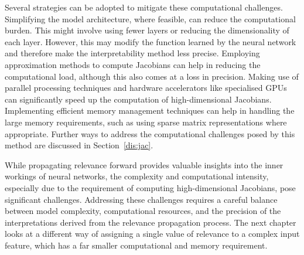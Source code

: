 Several strategies can be adopted to mitigate these computational challenges. Simplifying the model architecture, where feasible, can reduce the computational burden. This might involve using fewer layers or reducing the dimensionality of each layer. However, this may modify the function learned by the neural network and therefore make the interpretability method less precise. Employing approximation methods to compute Jacobians can help in reducing the computational load, although this also comes at a loss in precision. Making use of parallel processing techniques and hardware accelerators like specialised GPUs can significantly speed up the computation of high-dimensional Jacobians. Implementing efficient memory management techniques can help in handling the large memory requirements, such as using sparse matrix representations where appropriate. Further ways to address the computational challenges posed by this method are discussed in Section~\ref{dis:jac}.


While propagating relevance forward provides valuable insights into the inner workings of neural networks, the complexity and computational intensity, especially due to the requirement of computing high-dimensional Jacobians, pose significant challenges. Addressing these challenges requires a careful balance between model complexity, computational resources, and the precision of the interpretations derived from the relevance propagation process. The next chapter looks at a different way of assigning a single value of relevance to a complex input feature, which has a far smaller computational and memory requirement. 
